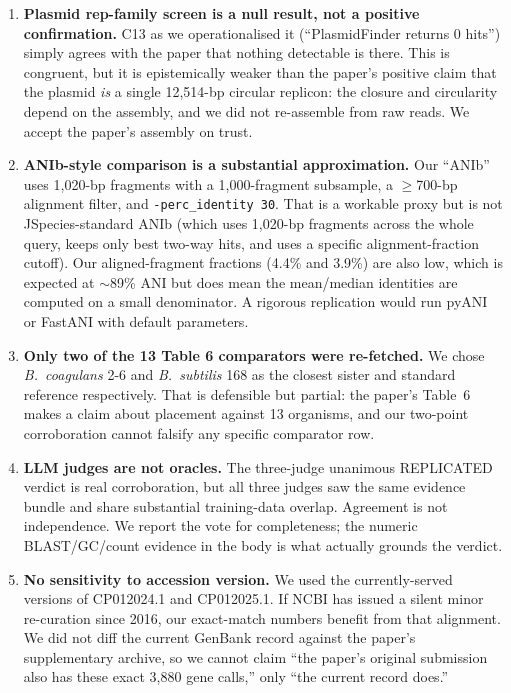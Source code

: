 \documentclass[11pt]{article}
\begin{document}
\begin{enumerate}
\item \textbf{Plasmid rep-family screen is a null result, not a positive confirmation.}
C13 as we operationalised it (``PlasmidFinder returns 0 hits'') simply agrees with the paper that nothing detectable is there. This is congruent, but it is epistemically weaker than the paper's positive claim that the plasmid \emph{is} a single 12{,}514-bp circular replicon: the closure and circularity depend on the assembly, and we did not re-assemble from raw reads. We accept the paper's assembly on trust.

\item \textbf{ANIb-style comparison is a substantial approximation.}
Our ``ANIb'' uses 1{,}020-bp fragments with a 1{,}000-fragment subsample, a $\geq$700-bp alignment filter, and \texttt{-perc\_identity 30}. That is a workable proxy but is not JSpecies-standard ANIb (which uses 1{,}020-bp fragments across the whole query, keeps only best two-way hits, and uses a specific alignment-fraction cutoff). Our aligned-fragment fractions (4.4\% and 3.9\%) are also low, which is expected at $\sim$89\% ANI but does mean the mean/median identities are computed on a small denominator. A rigorous replication would run pyANI or FastANI with default parameters.

\item \textbf{Only two of the 13 Table 6 comparators were re-fetched.}
We chose \textit{B.\ coagulans} 2-6 and \textit{B.\ subtilis} 168 as the closest sister and standard reference respectively. That is defensible but partial: the paper's Table~6 makes a claim about placement against 13 organisms, and our two-point corroboration cannot falsify any specific comparator row.

\item \textbf{LLM judges are not oracles.}
The three-judge unanimous \textsc{REPLICATED} verdict is real corroboration, but all three judges saw the same evidence bundle and share substantial training-data overlap. Agreement is not independence. We report the vote for completeness; the numeric BLAST/GC/count evidence in the body is what actually grounds the verdict.

\item \textbf{No sensitivity to accession version.}
We used the currently-served versions of CP012024.1 and CP012025.1. If NCBI has issued a silent minor re-curation since 2016, our exact-match numbers benefit from that alignment. We did not diff the current GenBank record against the paper's supplementary archive, so we cannot claim ``the paper's original submission also has these exact 3{,}880 gene calls,'' only ``the current record does.''


\end{enumerate}
\end{document}
